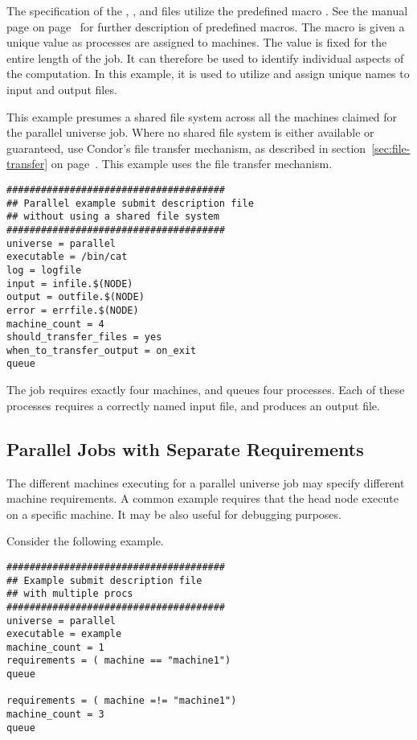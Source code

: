 The specification of the , ,
and  files utilize the predefined macro 
.
See the 
manual page on page~\pageref{man-condor-submit} for further
description of predefined macros.
The  macro is given a
unique value as processes are assigned to machines.
The  value is fixed for the entire length of the job.
It can therefore be used to identify individual aspects of the computation.
In this example, it is used to utilize and assign unique names to
input and output files.

This example presumes a shared file system across all the machines
claimed for the parallel universe job. 
Where no shared file system is either available or guaranteed,
use Condor's file transfer mechanism,
as described in section~\ref{sec:file-transfer}
on page~\pageref{sec:file-transfer}.
This example uses the file transfer mechanism.

\begin{verbatim}
######################################
## Parallel example submit description file
## without using a shared file system
######################################
universe = parallel
executable = /bin/cat
log = logfile
input = infile.$(NODE)
output = outfile.$(NODE)
error = errfile.$(NODE)
machine_count = 4
should_transfer_files = yes
when_to_transfer_output = on_exit
queue
\end{verbatim}

The job requires exactly four machines,
and queues four processes.
Each of these processes requires a correctly named input file,
and produces an output file.

\subsection{\label{sec:parallel-multi-proc}Parallel Jobs with Separate Requirements}

The different machines executing for a parallel universe job
may specify different machine requirements.
A common example requires that the
head node execute on a specific machine.
It may be also useful for debugging purposes.

Consider the following example.

\begin{verbatim}
######################################
## Example submit description file
## with multiple procs
######################################
universe = parallel
executable = example
machine_count = 1
requirements = ( machine == "machine1")
queue

requirements = ( machine =!= "machine1")
machine_count = 3
queue
\end{verbatim}

